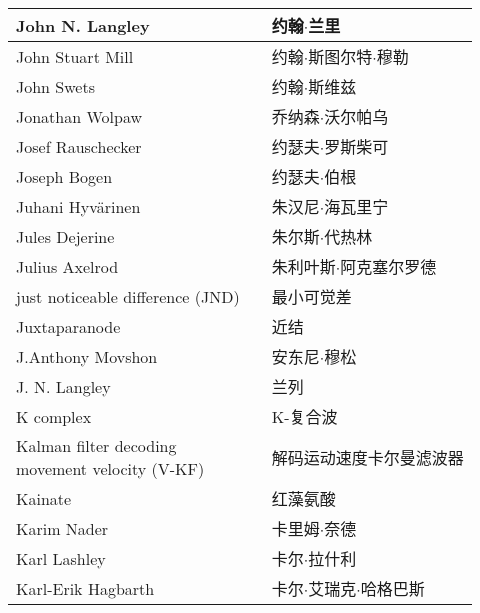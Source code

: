 \begin{longtable}{lll}
	\midrule
	John N. Langley   && 约翰$\cdot$兰里  \\
	
	\midrule
	John Stuart Mill   && 约翰$\cdot$斯图尔特$\cdot$穆勒  \\
	
	\midrule
	John Swets   && 约翰$\cdot$斯维兹  \\
	
	\midrule
	Jonathan Wolpaw   && 乔纳森$\cdot$沃尔帕乌  \\
	
	\midrule
	Josef Rauschecker   && 约瑟夫$\cdot$罗斯柴可  \\
	
	\midrule
	Joseph Bogen   && 约瑟夫$\cdot$伯根  \\
	
	\midrule
	Juhani Hyvärinen   && 朱汉尼$\cdot$海瓦里宁  \\
	
	\midrule
	Jules Dejerine   && 朱尔斯$\cdot$代热林  \\
	
	\midrule
	Julius Axelrod   && 朱利叶斯$\cdot$阿克塞尔罗德  \\
	
	\midrule
	just noticeable difference (JND)   && 最小可觉差  \\
	
	\midrule
	Juxtaparanode   && 近结  \\
	
	\midrule
	J.Anthony Movshon   && 安东尼$\cdot$穆松  \\
	
	\midrule
	J. N. Langley   && 兰列  \\
	
	\midrule
	K complex   && K-复合波  \\
	
	\midrule
	\makecell[l]{Kalman filter decoding \\movement velocity (V-KF)}   && 解码运动速度卡尔曼滤波器  \\
	
	\midrule
	Kainate   && 红藻氨酸  \\
	
	\midrule
	Karim Nader   && 卡里姆$\cdot$奈德  \\
	
	\midrule
	Karl Lashley  && 卡尔$\cdot$拉什利  \\
	
	\midrule
	Karl-Erik Hagbarth  && 卡尔$\cdot$艾瑞克$\cdot$哈格巴斯  \\
	

\end{longtable}
